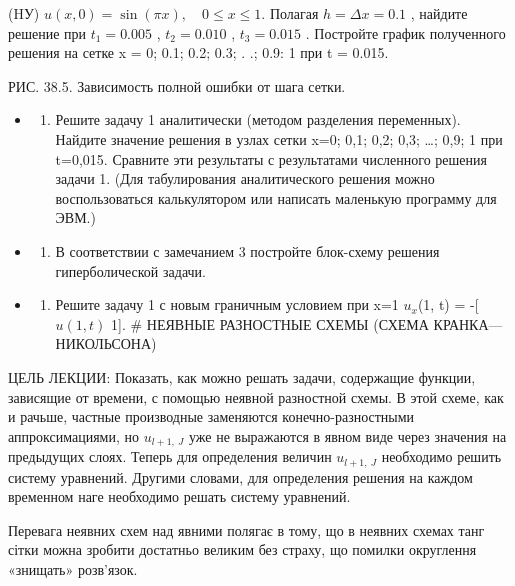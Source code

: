 \documentclass[
  ukrainian,
]{article}
\providecommand{\tightlist}{%
  \setlength{\itemsep}{0pt}\setlength{\parskip}{0pt}}
\begin{document}
(HУ) \(u(x, 0) = \sin(\pi x), \quad 0 \le x \le 1.\) Полагая
\(h = \Delta x = 0.1\) , найдите решение при \(t_1 = 0.005\) ,
\(t_2 = 0.010\) , \(t_3 = 0.015\) . Постройте график полученного решения
на сетке x = 0; 0.1; 0.2; 0.3; . .; 0.9: 1 при t = 0.015.

РИС. 38.5. Зависимость полной ошибки от шага сетки.

\begin{itemize}
\tightlist
\item
  \begin{enumerate}
  \def\labelenumi{\arabic{enumi}.}
  \setcounter{enumi}{1}
  \tightlist
  \item
    Решите задачу 1 аналитически (методом разделения переменных).
    Найдите значение решения в узлах сетки x=0; 0,1; 0,2; 0,3; \ldots;
    0,9; 1 при t=0,015. Сравните эти результаты с результатами
    численного решения задачи 1. (Для табулирования аналитического
    решения можно воспользоваться калькулятором или написать маленькую
    программу для ЭВМ.)
  \end{enumerate}
\item
  \begin{enumerate}
  \def\labelenumi{\arabic{enumi}.}
  \setcounter{enumi}{2}
  \tightlist
  \item
    В соответствии с замечанием 3 постройте блок-схему решения
    гиперболической задачи.
  \end{enumerate}
\item
  \begin{enumerate}
  \def\labelenumi{\arabic{enumi}.}
  \setcounter{enumi}{3}
  \tightlist
  \item
    Решите задачу 1 с новым граничным условием при x=1 \(u_x\)(1, t) =
    -{[}\(u(1, t)\) 1{]}. \# НЕЯВНЫЕ РАЗНОСТНЫЕ СХЕМЫ (СХЕМА
    КРАНКА---НИКОЛЬСОНА)
  \end{enumerate}
\end{itemize}

ЦЕЛЬ ЛЕКЦИИ: Показать, как можно решать задачи, содержащие функции,
зависящие от времени, с помощью неявной разностной схемы. В этой схеме,
как и рачьше, частные производные заменяются конечно-разностными
аппроксимациями, но \(u_{l+1,\ J}\) уже не выражаются в явном виде через
значения на предыдущих слоях. Теперь для определения величин
\(u_{l+1,\ J}\) необходимо решить систему уравнений. Другими словами,
для определения решения на каждом временном наге необходимо решать
систему уравнений.

Перевага неявних схем над явними полягає в тому, що в неявних схемах
танг сітки можна зробити достатньо великим без страху, що помилки
округлення «знищать» розв'язок.
\end{document}
